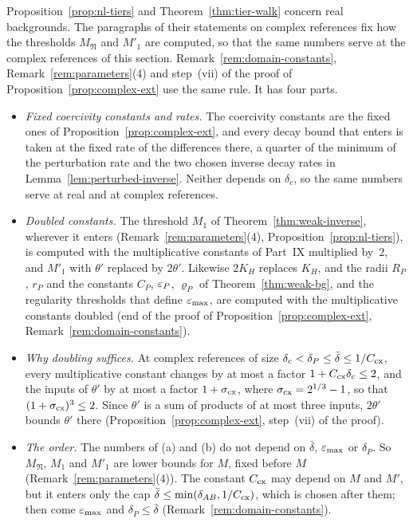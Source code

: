 \begin{remark}\label{rem:complex-in-44}
Proposition~\ref{prop:nl-tiers} and Theorem~\ref{thm:tier-walk} concern real backgrounds. The paragraphs of their statements on complex references fix how the thresholds $M_{\mathfrak N}$ and $M'_1$ are computed, so that the same numbers serve at the complex references of this section. Remark~\ref{rem:domain-constants}, Remark~\ref{rem:parameters}(4) and step~(vii) of the proof of Proposition~\ref{prop:complex-ext} use the same rule. It has four parts.
\begin{itemize}
\item[(a)] \emph{Fixed coercivity constants and rates.} The coercivity constants are the fixed ones of Proposition~\ref{prop:complex-ext}, and every decay bound that enters is taken at the fixed rate of the differences there, a quarter of the minimum of the perturbation rate and the two chosen inverse decay rates in Lemma~\ref{lem:perturbed-inverse}. Neither depends on $\delta_c$, so the same numbers serve at real and at complex references.
\item[(b)] \emph{Doubled constants.} The threshold $M_1$ of Theorem~\ref{thm:weak-inverse}, wherever it enters (Remark~\ref{rem:parameters}(4), Proposition~\ref{prop:nl-tiers}), is computed with the multiplicative constants of Part~IX multiplied by~$2$, and $M'_1$ with $\theta'$ replaced by $2\theta'$. Likewise $2K_H$ replaces $K_H$, and the radii $R_P$, $r_P$ and the constants $C_P$, $\varepsilon_P$, $\varrho_P$ of Theorem~\ref{thm:weak-bg}, and the regularity thresholds that define $\varepsilon_{\max}$, are computed with the multiplicative constants doubled (end of the proof of Proposition~\ref{prop:complex-ext}, Remark~\ref{rem:domain-constants}).
\item[(c)] \emph{Why doubling suffices.} At complex references of size $\delta_c<\delta_P\le\bar\delta\le1/C_{\rm cx}$, every multiplicative constant changes by at most a factor $1+C_{\rm cx}\delta_c\le2$, and the inputs of $\theta'$ by at most a factor $1+\sigma_{\rm cx}$, where $\sigma_{\rm cx}=2^{1/3}-1$, so that $(1+\sigma_{\rm cx})^3\le2$. Since $\theta'$ is a sum of products of at most three inputs, $2\theta'$ bounds $\theta'$ there (Proposition~\ref{prop:complex-ext}, step~(vii) of the proof).
\item[(d)] \emph{The order.} The numbers of (a) and (b) do not depend on $\bar\delta$, $\varepsilon_{\max}$ or $\delta_P$. So $M_{\mathfrak N}$, $M_1$ and $M'_1$ are lower bounds for $M$, fixed before $M$ (Remark~\ref{rem:parameters}(4)). The constant $C_{\rm cx}$ may depend on $M$ and $M'$, but it enters only the cap $\bar\delta\le\min(\delta_{AB},1/C_{\rm cx})$, which is chosen after them; then come $\varepsilon_{\max}$ and $\delta_P\le\bar\delta$ (Remark~\ref{rem:domain-constants}).
\end{itemize}
\end{remark}
